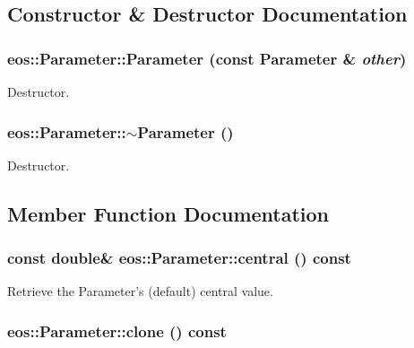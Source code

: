 \subsection{Constructor \& Destructor Documentation}
\hypertarget{classeos_1_1Parameter_ac64d342eed9e01a93a42e00403ab041f}{
\subsubsection[{Parameter}]{\setlength{\rightskip}{0pt plus 5cm}eos::Parameter::Parameter (const {\bf Parameter} \& {\em other})}}
\label{classeos_1_1Parameter_ac64d342eed9e01a93a42e00403ab041f}


Destructor. \hypertarget{classeos_1_1Parameter_ac5e6dd06494095cffe292e4b4dc200c8}{
\subsubsection[{$\sim$Parameter}]{\setlength{\rightskip}{0pt plus 5cm}eos::Parameter::$\sim$Parameter ()}}
\label{classeos_1_1Parameter_ac5e6dd06494095cffe292e4b4dc200c8}


Destructor. 

\subsection{Member Function Documentation}
\hypertarget{classeos_1_1Parameter_a1c0a1ce478f2275d1259483fa919ec60}{
\subsubsection[{central}]{\setlength{\rightskip}{0pt plus 5cm}const double\& eos::Parameter::central () const}}
\label{classeos_1_1Parameter_a1c0a1ce478f2275d1259483fa919ec60}


Retrieve the Parameter's (default) central value. \hypertarget{classeos_1_1Parameter_a8a643807f254a9601349c779cf6211dc}{
\subsubsection[{clone}]{ eos::Parameter::clone () const}}
\label{classeos_1_1Parameter_a8a643807f254a9601349c779cf6211dc}


